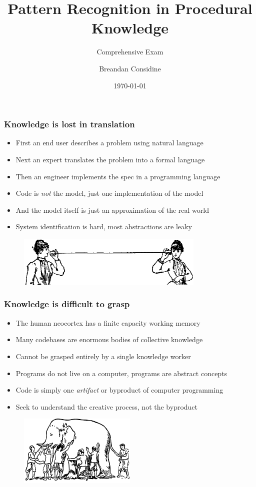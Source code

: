\documentclass{beamer}
\title{Pattern Recognition in Procedural Knowledge}
\subtitle{Comprehensive Exam}
\author{Breandan Considine}
\institute[McGill]{
McGill University \\
\medskip
\textit{breandan.considine@mcgill.ca}
}
\date{\today}
\begin{document}
  \begin{frame}
    \titlepage
  \end{frame}

  \begin{frame}
    \frametitle{Knowledge is lost in translation}
    \begin{itemize}
      \item First an end user describes a problem using natural language
      \item Next an expert translates the problem into a formal language
      \item Then an engineer implements the spec in a programming language
      \item Code is \textit{not} the model, just one implementation of the model
      \item And the model itself is just an approximation of the real world
      \item System identification is hard, most abstractions are leaky
    \end{itemize}
    \begin{figure}[H]
      \centering
      \includegraphics[width=0.8\textwidth]{../clipart/tincan.jpg}
    \end{figure}
  \end{frame}

  \begin{frame}
    \frametitle{Knowledge is difficult to grasp}
    \begin{itemize}
      \item The human neocortex has a finite capacity working memory
      \item Many codebases are enormous bodies of collective knowledge
      \item Cannot be grasped entirely by a single knowledge worker
      \item Programs do not live on a computer, programs are abstract concepts
      \item Code is simply one \textit{artifact} or byproduct of computer programming
      \item Seek to understand the creative process, not the byproduct
    \end{itemize}
    \begin{figure}[H]
      \centering
      \includegraphics[width=0.5\textwidth]{../clipart/elephant.png}
    \end{figure}
  \end{frame}
\end{document}
